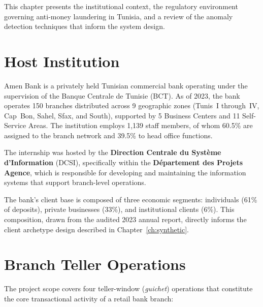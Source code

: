 This chapter presents the institutional context, the regulatory environment
governing anti-money laundering in Tunisia, and a review of the anomaly
detection techniques that inform the system design.

\section{Host Institution}
\label{sec:amen-bank}

Amen Bank is a privately held Tunisian commercial bank operating under the
supervision of the Banque Centrale de Tunisie (BCT). As of 2023, the bank
operates 150 branches distributed across 9 geographic zones (Tunis~I
through~IV, Cap~Bon, Sahel, Sfax, and South), supported by 5 Business
Centers and 11 Self-Service Areas. The institution employs 1,139 staff
members, of whom 60.5\% are assigned to the branch network and 39.5\% to
head office functions.

The internship was hosted by the \textbf{Direction Centrale du Système
d'Information} (DCSI), specifically within the \textbf{Département des
Projets Agence}, which is responsible for developing and maintaining the
information systems that support branch-level operations.

The bank's client base is composed of three economic segments: individuals
(61\% of deposits), private businesses (33\%), and institutional clients
(6\%). This composition, drawn from the audited 2023 annual report,
directly informs the client archetype design described in
Chapter~\ref{ch:synthetic}.


\section{Branch Teller Operations}
\label{sec:caisse-ops}

The project scope covers four teller-window (\textit{guichet}) operations
that constitute the core transactional activity of a retail bank branch:


